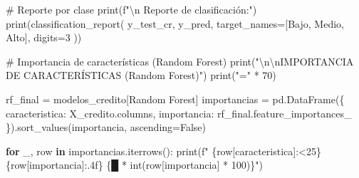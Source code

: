 \documentclass[
  doc,
  floatsintext,
  longtable,
  a4paper,
  nolmodern,
  notxfonts,
  notimes,
  12pt,
  colorlinks=true,linkcolor=blue,citecolor=blue,urlcolor=blue]{apa7}
\newenvironment{Shaded}{\begin{snugshade}}{\end{snugshade}}
\newcommand{\BuiltInTok}[1]{\textcolor[rgb]{0.00,0.23,0.31}{#1}}
\newcommand{\CharTok}[1]{\textcolor[rgb]{0.13,0.47,0.30}{#1}}
\newcommand{\CommentTok}[1]{\textcolor[rgb]{0.37,0.37,0.37}{#1}}
\newcommand{\ControlFlowTok}[1]{\textcolor[rgb]{0.00,0.23,0.31}{\textbf{#1}}}
\newcommand{\DecValTok}[1]{\textcolor[rgb]{0.68,0.00,0.00}{#1}}
\newcommand{\KeywordTok}[1]{\textcolor[rgb]{0.00,0.23,0.31}{\textbf{#1}}}
\newcommand{\NormalTok}[1]{\textcolor[rgb]{0.00,0.23,0.31}{#1}}
\newcommand{\OperatorTok}[1]{\textcolor[rgb]{0.37,0.37,0.37}{#1}}
\newcommand{\SpecialCharTok}[1]{\textcolor[rgb]{0.37,0.37,0.37}{#1}}
\newcommand{\SpecialStringTok}[1]{\textcolor[rgb]{0.13,0.47,0.30}{#1}}
\newcommand{\StringTok}[1]{\textcolor[rgb]{0.13,0.47,0.30}{#1}}
\newcommand{\VariableTok}[1]{\textcolor[rgb]{0.07,0.07,0.07}{#1}}
\begin{document}
\begin{Shaded}
\begin{Highlighting}[]
    \CommentTok{\# Reporte por clase}
    \BuiltInTok{print}\NormalTok{(}\SpecialStringTok{f"}\CharTok{\textbackslash{}n}\SpecialStringTok{  Reporte de clasificación:"}\NormalTok{)}
    \BuiltInTok{print}\NormalTok{(classification\_report(}
\NormalTok{        y\_test\_cr, y\_pred,}
\NormalTok{        target\_names}\OperatorTok{=}\NormalTok{[}\StringTok{\textquotesingle{}Bajo\textquotesingle{}}\NormalTok{, }\StringTok{\textquotesingle{}Medio\textquotesingle{}}\NormalTok{, }\StringTok{\textquotesingle{}Alto\textquotesingle{}}\NormalTok{],}
\NormalTok{        digits}\OperatorTok{=}\DecValTok{3}
\NormalTok{    ))}

\CommentTok{\# Importancia de características (Random Forest)}
\BuiltInTok{print}\NormalTok{(}\StringTok{"}\CharTok{\textbackslash{}n\textbackslash{}n}\StringTok{IMPORTANCIA DE CARACTERÍSTICAS (Random Forest)"}\NormalTok{)}
\BuiltInTok{print}\NormalTok{(}\StringTok{"="} \OperatorTok{*} \DecValTok{70}\NormalTok{)}

\NormalTok{rf\_final }\OperatorTok{=}\NormalTok{ modelos\_credito[}\StringTok{\textquotesingle{}Random Forest\textquotesingle{}}\NormalTok{]}
\NormalTok{importancias }\OperatorTok{=}\NormalTok{ pd.DataFrame(\{}
    \StringTok{\textquotesingle{}caracteristica\textquotesingle{}}\NormalTok{: X\_credito.columns,}
    \StringTok{\textquotesingle{}importancia\textquotesingle{}}\NormalTok{: rf\_final.feature\_importances\_}
\NormalTok{\}).sort\_values(}\StringTok{\textquotesingle{}importancia\textquotesingle{}}\NormalTok{, ascending}\OperatorTok{=}\VariableTok{False}\NormalTok{)}

\ControlFlowTok{for}\NormalTok{ \_, row }\KeywordTok{in}\NormalTok{ importancias.iterrows():}
    \BuiltInTok{print}\NormalTok{(}\SpecialStringTok{f"  }\SpecialCharTok{\{}\NormalTok{row[}\StringTok{\textquotesingle{}caracteristica\textquotesingle{}}\NormalTok{]}\SpecialCharTok{:\textless{}25\}}\SpecialStringTok{ }\SpecialCharTok{\{}\NormalTok{row[}\StringTok{\textquotesingle{}importancia\textquotesingle{}}\NormalTok{]}\SpecialCharTok{:.4f\}}\SpecialStringTok{ }\SpecialCharTok{\{}\StringTok{\textquotesingle{}█\textquotesingle{}} \OperatorTok{*} \BuiltInTok{int}\NormalTok{(row[}\StringTok{\textquotesingle{}importancia\textquotesingle{}}\NormalTok{] }\OperatorTok{*} \DecValTok{100}\NormalTok{)}\SpecialCharTok{\}}\SpecialStringTok{"}\NormalTok{)}
\end{Highlighting}
\end{Shaded}
\end{document}
